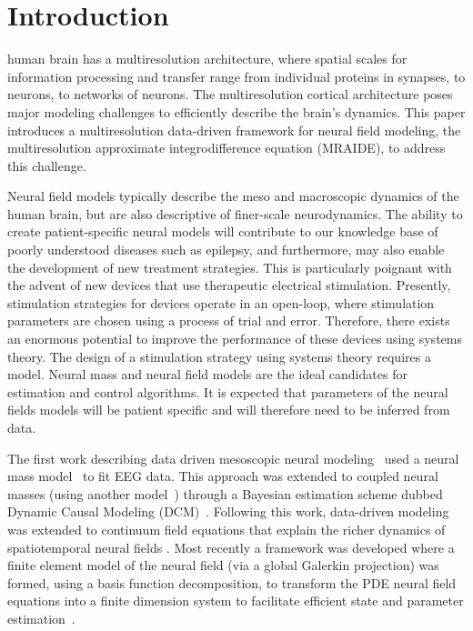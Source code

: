 \documentclass[journal,a4paper]{IEEEtran}
\newcommand{\cut}[1]{\textcolor{cyan}{#1}}
\begin{document}

\section{Introduction}
 human brain has a multiresolution architecture, where spatial scales for information processing and transfer range from individual proteins in synapses, to neurons, to networks of neurons. The multiresolution cortical architecture poses major modeling challenges to efficiently describe the brain's dynamics. This paper introduces a multiresolution data-driven framework for neural field modeling, the multiresolution approximate integrodifference equation (MRAIDE), to address this challenge. 

Neural field models typically describe the meso and macroscopic dynamics of the human brain, but are also descriptive of finer-scale neurodynamics. The ability to create patient-specific neural models will contribute to our knowledge base of poorly understood diseases such as epilepsy, and furthermore, may also enable the development of new treatment strategies. This is particularly poignant with the advent of new devices that use therapeutic electrical stimulation. Presently, stimulation strategies for devices operate in an open-loop, where stimulation parameters are chosen using a process of trial and error. Therefore, there exists an enormous potential to improve the performance of these devices using systems theory. The design of a stimulation strategy using systems theory requires a model. Neural mass and neural field models are the ideal candidates for estimation and control algorithms. It is expected that parameters of the neural fields models will be patient specific and will therefore need to be inferred from data.

The first work describing data driven mesoscopic neural modeling~\cite{Valdes1999} used a neural mass model~\cite{LopesDaSilva1976,Zetterberg1978} to fit EEG data. This approach was extended to coupled neural masses (using another model~\cite{Jansen1995}) through a Bayesian estimation scheme dubbed Dynamic Causal Modeling (DCM)~\cite{David2003}. Following this work, data-driven modeling was extended to continuum field equations that explain the richer dynamics of spatiotemporal neural fields \cite{Galka2008,schiff2008kalman,Daunizeau2009}. Most recently a framework was developed where a finite element model of the neural field (via a global Galerkin projection) was formed, using a basis function decomposition, to transform the PDE neural field equations into a finite dimension system to facilitate efficient state and parameter estimation~\cite{Freestone2011}.  
\end{document}
